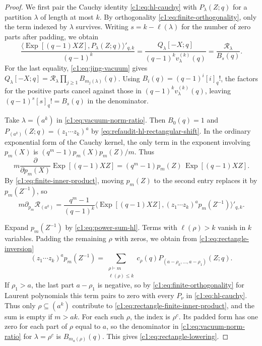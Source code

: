 \documentclass[12pt,reqno,a4paper]{amsart}
\numberwithin{equation}{section}
\numberwithin{figure}{section}
\theoremstyle{plain}
\theoremstyle{definition}
\begin{document}
\begin{proof}
We first pair the Cauchy identity \eqref{c1:eq:hl-cauchy} with
$P_\lambda(Z;q)$ for a partition $\lambda$ of length at most $k$.
By orthogonality \eqref{c1:eq:finite-orthogonality}, only the term
indexed by $\lambda$ survives.  Writing $s=k-\ell(\lambda)$ for the
number of zero parts after padding, we obtain
\begin{equation}\label{c1:eq:vacuum-norm-ratio}
 \frac{\bigl\langle\operatorname{Exp}[(q-1)XZ],P_\lambda(Z;q)
       \bigr\rangle'_{q,k}}{(q-1)^k}
 =\frac{Q_\lambda[-X;q]}{(q-1)^k v_\lambda^{(k)}(q)}
 =\frac{\mathcal R_\lambda}{B_s(q)}.
\end{equation}
For the last equality, \eqref{c1:eq:jing-vacuum} gives
$Q_\lambda[-X;q]=\mathcal R_\lambda\prod_{j\geq1}B_{m_j(\lambda)}(q)$.
Using $B_i(q)=(q-1)^i[i]_q!$, the factors for the positive parts
cancel against those in $(q-1)^k v_\lambda^{(k)}(q)$, leaving
$(q-1)^s[s]_q!=B_s(q)$ in the denominator.

Take $\lambda=(a^k)$ in \eqref{c1:eq:vacuum-norm-ratio}.
Then $B_0(q)=1$ and $P_{(a^k)}(Z;q)=(z_1\cdots z_k)^a$ by
\eqref{eq:refaudit-hl-rectangular-shift}.
In the ordinary exponential form of the Cauchy kernel, the only term
in the exponent involving $p_m(X)$ is $(q^m-1)p_m(X)p_m(Z)/m$.  Thus
\[
 m\frac{\partial}{\partial p_m(X)}\operatorname{Exp}[(q-1)XZ]
 =(q^m-1)p_m(Z)\,\operatorname{Exp}[(q-1)XZ].
\]
By \eqref{c1:eq:finite-inner-product}, moving
$p_m(Z)$ to the second entry replaces it by $p_m(Z^{-1})$, so
\begin{equation}\label{c1:eq:rectangle-finite-inner-product}
 m\partial_{p_m}\mathcal R_{(a^k)}
 =\frac{q^m-1}{(q-1)^k}
 \bigl\langle\operatorname{Exp}[(q-1)XZ],
       (z_1\cdots z_k)^a p_m(Z^{-1})\bigr\rangle'_{q,k}.
\end{equation}

Expand $p_m(Z^{-1})$ by \eqref{c1:eq:power-sum-hl}.  Terms with
$\ell(\rho)>k$ vanish in $k$ variables.  Padding the remaining $\rho$
with zeros, we obtain from \eqref{c1:eq:rectangle-inversion}
\[
 (z_1\cdots z_k)^a p_m(Z^{-1})
 =\sum_{\substack{\rho\vdash m\\\ell(\rho)\leq k}}
     c_\rho(q)P_{(a-\rho_k,\ldots,a-\rho_1)}(Z;q).
\]
If $\rho_1>a$, the last part $a-\rho_1$ is negative, so by
\eqref{c1:eq:finite-orthogonality} for Laurent polynomials this term
pairs to zero with every $P_\nu$ in \eqref{c1:eq:hl-cauchy}.
Thus only $\rho\subseteq(a^k)$ contribute to
\eqref{c1:eq:rectangle-finite-inner-product}, and the sum is empty if
$m>ak$.  For each such $\rho$, the index is $\rho^c$.  Its padded form
has one zero for each part of $\rho$ equal to $a$, so the denominator
in \eqref{c1:eq:vacuum-norm-ratio} for $\lambda=\rho^c$ is
$B_{m_a(\rho)}(q)$.  This gives \eqref{c1:eq:rectangle-lowering}.


\end{proof}
\end{document}
